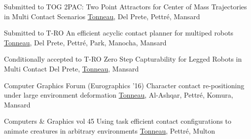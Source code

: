 \documentclass{tccv}
\begin{document}
\begin{eventlist}

\item {Submitted to TOG} 
{2PAC: Two Point Attractors for Center of Mass
Trajectories in Multi Contact Scenarios}
{\underline{Tonneau}, Del Prete, Pettr\'e, Mansard}

\item {Submitted to T-RO} 
{An efficient acyclic contact planner for multiped robots}
{\underline{Tonneau}, Del Prete, Pettr\'e, Park, Manocha, Mansard}

\item {Conditionally accepted to T-RO} 
{Zero Step Capturability for Legged Robots in Multi Contact}
{Del Prete, \underline{Tonneau}, Mansard}

\item {Computer Graphics Forum (Eurographics '16)} 
{Character contact re-positioning under large environment deformation}
{\underline{Tonneau}, Al-Ashqar, Pettr\'e, Komura, Mansard}

\item {Computers \& Graphics vol 45} 
{Using task efficient contact configurations to animate 
creatures in arbitrary environments}
{\underline{Tonneau}, Pettr\'e, Multon}



\end{eventlist}

\end{document}
